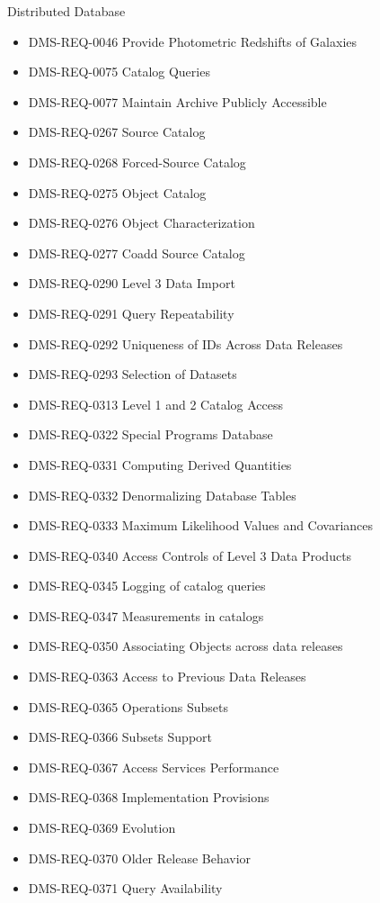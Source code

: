 Distributed Database \begin{itemize}
\item DMS-REQ-0046 Provide Photometric Redshifts of Galaxies
\item DMS-REQ-0075 Catalog Queries
\item DMS-REQ-0077 Maintain Archive Publicly Accessible
\item DMS-REQ-0267 Source Catalog
\item DMS-REQ-0268 Forced-Source Catalog
\item DMS-REQ-0275 Object Catalog
\item DMS-REQ-0276 Object Characterization
\item DMS-REQ-0277 Coadd Source Catalog
\item DMS-REQ-0290 Level 3 Data Import
\item DMS-REQ-0291 Query Repeatability
\item DMS-REQ-0292 Uniqueness of IDs Across Data Releases
\item DMS-REQ-0293 Selection of Datasets
\item DMS-REQ-0313 Level 1 and 2 Catalog Access
\item DMS-REQ-0322 Special Programs Database
\item DMS-REQ-0331 Computing Derived Quantities
\item DMS-REQ-0332 Denormalizing Database Tables
\item DMS-REQ-0333 Maximum Likelihood Values and Covariances
\item DMS-REQ-0340 Access Controls of Level 3 Data Products
\item DMS-REQ-0345 Logging of catalog queries
\item DMS-REQ-0347 Measurements in catalogs
\item DMS-REQ-0350 Associating Objects across data releases
\item DMS-REQ-0363 Access to Previous Data Releases
\item DMS-REQ-0365 Operations Subsets
\item DMS-REQ-0366 Subsets Support
\item DMS-REQ-0367 Access Services Performance
\item DMS-REQ-0368 Implementation Provisions
\item DMS-REQ-0369 Evolution
\item DMS-REQ-0370 Older Release Behavior
\item DMS-REQ-0371 Query Availability
\end{itemize}
